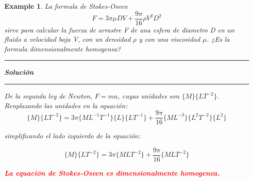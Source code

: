 \documentclass[10pt, oneside]{article}
\newtheorem{exa}{Example}
\begin{document}
\begin{shaded}
\begin{exa}
La formula de Stokes-Oseen 
$$
F=3\pi \mu D V + \frac{9 \pi}{16} \rho V^2 D^2
$$
sirve para calcular la fuerza de arrastre F de una esfera de diametro D en un fluido a velocidad baja V, con un densidad $\rho$ y con una viscosidad $\mu$. ¿Es la formula dimensionalmente homogenea?
\vspace{0.2cm}
\hrule
\vspace{0.2cm}
\noindent \textbf{Soluci\'on}
\vspace{0.2cm}
\hrule
\vspace{0.2cm}

De la segunda ley de Newton, $F=ma$,  cuyas unidades son $\{M\} \{L T^{-2}\}$. Renplazando las unidades en la equaci\'on:
$$
\{M\} \{L T^{-2}\} = 3\pi \{M L^{-1} T^{-1}\} \{L\} \{L T^{-1}\} + \frac{9\pi}{16} \{M L^{-3}\} \{L^2 T^{-2}\} \{L^2\} 
$$

simplificando el lado izquierdo de la equaci\'on:

$$
\{M\} \{L T^{-2}\} = 3\pi \{M L T^{-2}\} + \frac{9\pi}{16}  \{M L T^{-2}\}
$$

\begin{center}
\textcolor{red}{\textbf{La equaci\'on de Stokes-Oseen es dimensionalmente homogenea.}}
\end{center}

\end{exa}
\end{shaded}
\end{document}
